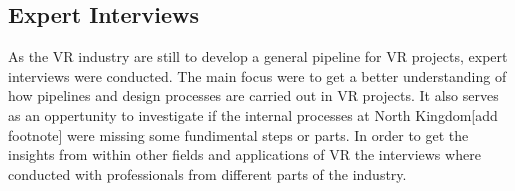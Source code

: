 \subsection{Expert Interviews}
As the VR industry are still to develop a general pipeline for VR projects, expert interviews were conducted. The main focus were to get a better understanding of how pipelines and design processes are carried out in VR projects. It also serves as an oppertunity to investigate if the internal processes at North Kingdom[add footnote] were missing some fundimental steps or parts. In order to get the insights from within other fields and applications of VR the interviews where conducted with professionals from different parts of the industry.
